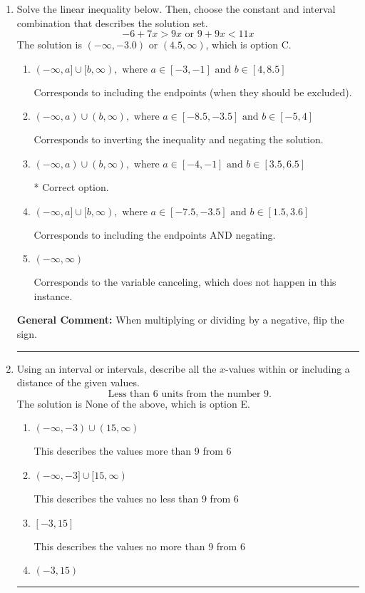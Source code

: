\documentclass{extbook}[14pt]
\newcommand{\litem}[1]{\item #1

\rule{\textwidth}{0.4pt}}
\begin{document}
\begin{enumerate}\litem{
Solve the linear inequality below. Then, choose the constant and interval combination that describes the solution set.
\[ -6 + 7 x > 9 x \text{ or } 9 + 9 x < 11 x \]
The solution is \( (-\infty, -3.0) \text{ or } (4.5, \infty) \), which is option C.\begin{enumerate}[label=\Alph*.]
\item \( (-\infty, a] \cup [b, \infty), \text{ where } a \in [-3, -1] \text{ and } b \in [4, 8.5] \)

Corresponds to including the endpoints (when they should be excluded).
\item \( (-\infty, a) \cup (b, \infty), \text{ where } a \in [-8.5, -3.5] \text{ and } b \in [-5, 4] \)

Corresponds to inverting the inequality and negating the solution.
\item \( (-\infty, a) \cup (b, \infty), \text{ where } a \in [-4, -1] \text{ and } b \in [3.5, 6.5] \)

 * Correct option.
\item \( (-\infty, a] \cup [b, \infty), \text{ where } a \in [-7.5, -3.5] \text{ and } b \in [1.5, 3.6] \)

Corresponds to including the endpoints AND negating.
\item \( (-\infty, \infty) \)

Corresponds to the variable canceling, which does not happen in this instance.
\end{enumerate}

\textbf{General Comment:} When multiplying or dividing by a negative, flip the sign.
}
\litem{
Using an interval or intervals, describe all the $x$-values within or including a distance of the given values.
\[ \text{ Less than } 6 \text{ units from the number } 9. \]
The solution is \( \text{None of the above} \), which is option E.\begin{enumerate}[label=\Alph*.]
\item \( (-\infty, -3) \cup (15, \infty) \)

This describes the values more than 9 from 6
\item \( (-\infty, -3] \cup [15, \infty) \)

This describes the values no less than 9 from 6
\item \( [-3, 15] \)

This describes the values no more than 9 from 6
\item \( (-3, 15) \)


\end{enumerate}}
\end{enumerate}
\end{document}
